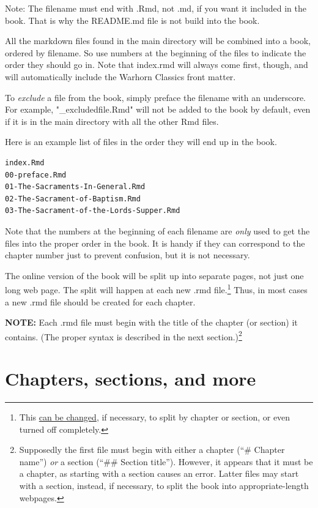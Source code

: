 \documentclass[
]{book}
\begin{document}
Note: The filename must end with .Rmd, not .md, if you want it included in the book. That is why the README.md file is not build into the book.

All the markdown files found in the main directory will be combined into a book, ordered by filename. So use numbers at the beginning of the files to indicate the order they should go in. Note that index.rmd will always come first, though, and will automatically include the Warhorn Classics front matter.

To \emph{exclude} a file from the book, simply preface the filename with an underscore. For example, "\_excludedfile.Rmd" will not be added to the book by default, even if it is in the main directory with all the other Rmd files.

Here is an example list of files in the order they will end up in the book.

\begin{verbatim}
index.Rmd
00-preface.Rmd
01-The-Sacraments-In-General.Rmd
02-The-Sacrament-of-Baptism.Rmd
03-The-Sacrament-of-the-Lords-Supper.Rmd
\end{verbatim}

Note that the numbers at the beginning of each filename are \emph{only} used to get the files into the proper order in the book. It is handy if they can correspond to the chapter number just to prevent confusion, but it is not necessary.

The online version of the book will be split up into separate pages, not just one long web page. The split will happen at each new .rmd file.\footnote{This \href{https://bookdown.org/yihui/bookdown/html.html\#gitbook-style}{can be changed}, if necessary, to split by chapter or section, or even turned off completely.} Thus, in most cases a new .rmd file should be created for each chapter.

\textbf{NOTE:} Each .rmd file must begin with the title of the chapter (or section) it contains. (The proper syntax is described in the next section.)\footnote{Supposedly the first file must begin with either a chapter (``\# Chapter name'') \emph{or} a section (``\#\# Section title''). However, it appears that it must be a chapter, as starting with a section causes an error. Latter files may start with a section, instead, if necessary, to split the book into appropriate-length webpages.}

\hypertarget{chapters-sections-and-more}{%
\section{Chapters, sections, and more}\label{chapters-sections-and-more}}
\end{document}
